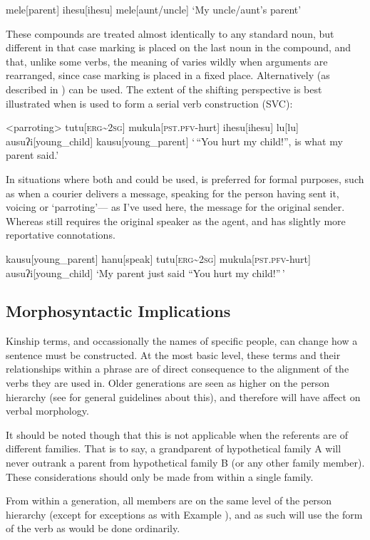 \ex
\begingl
mele[parent]
ihesu[ihesu]
mele[aunt/uncle]
\glft `My uncle/aunt's parent'
\endgl
\xe

These compounds are treated almost identically to any standard noun, but different in that case marking is placed on the last noun in the compound, and that, unlike some verbs, the meaning of  varies wildly when arguments are rearranged, since case marking is placed in a fixed place.
Alternatively  (as described in ) can be used.
The extent of the shifting perspective is best illustrated when  is used to form a serial verb construction (SVC):

\ex<parroting>
\begingl
tutu[\textsc{erg\textasciitilde 2sg}]
mukula[\textsc{pst.pfv-}hurt]
ihesu[ihesu]
lu[lu]
ausuʔi[young\_child]
kausu[young\_parent]
\glft `\,``You hurt my child!'', is what my parent said.'
\endgl
\xe

In situations where both  and  could be used,  is preferred for formal purposes, such as when a courier delivers a message, speaking for the person having sent it, voicing or `parroting'--- as I've used here, the message for the original sender.
Whereas  still requires the original speaker as the agent, and has slightly more reportative connotations.

\ex
\begingl
kausu[young\_parent]
hanu[speak]
tutu[\textsc{erg\textasciitilde 2sg}]
mukula[\textsc{pst.pfv-}hurt]
ausuʔi[young\_child]
\glft `My parent just said ``You hurt my child!''\,'
\endgl
\xe

\subsection{Morphosyntactic Implications}
Kinship terms, and occassionally the names of specific people, can change how a sentence must be constructed.
At the most basic level, these terms and their relationships within a phrase are of direct consequence to the alignment of the verbs they are used in.
Older generations are seen as higher on the person hierarchy (see  for general guidelines about this), and therefore will have affect on verbal morphology.

It should be noted though that this is not applicable when the referents are of different families.
That is to say, a grandparent of hypothetical family A will never outrank a parent from hypothetical family B (or any other family member).
These considerations should only be made from within a single family.

From within a generation, all members are on the same level of the person hierarchy (except for exceptions as with Example ), and as such will use the form of the verb as would be done ordinarily.
